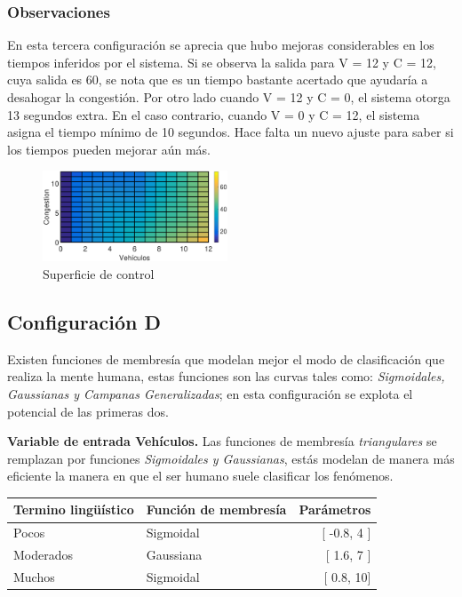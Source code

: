 \subsubsection{Observaciones}
\begin{multicols}{2}

	En esta tercera configuración se aprecia que hubo mejoras considerables en los tiempos inferidos por el sistema. Si se observa la salida para V = 12 y C = 12, cuya salida es 60, se nota que es un tiempo bastante acertado que ayudaría a desahogar la congestión. Por otro lado cuando V = 12 y C = 0, el sistema otorga 13 segundos extra. En el caso contrario, cuando V = 0 y C = 12, el sistema asigna el tiempo mínimo de 10 segundos. Hace falta un nuevo ajuste para saber si los tiempos pueden mejorar aún más.
	
	\begin{figure}[H]
		\includegraphics[width=0.49\textwidth]{Surfaces/Surface2D_C.eps}
		\caption{Superficie de control}
	\end{figure}
\end{multicols}
\pagebreak





\subsection{Configuración D}\label{section:configd}
Existen funciones de membresía que modelan mejor el modo de clasificación que realiza la mente humana, estas funciones son las curvas tales como: \textit{Sigmoidales, Gaussianas y Campanas Generalizadas}; en esta configuración se explota el potencial de las primeras dos.

\textbf{Variable de entrada Vehículos.} Las funciones de membresía \textit{triangulares} se remplazan por funciones \textit{Sigmoidales y Gaussianas}, estás modelan de manera más eficiente la manera en que el ser humano suele clasificar los fenómenos.
\begin{center}
	\begin{tabular}{llr} \toprule
		Termino lingüístico & Función de membresía & Parámetros \\ \midrule
		Pocos & Sigmoidal & [ -0.8, 4 ] \\
		Moderados & Gaussiana & [ 1.6, 7 ] \\
		Muchos & Sigmoidal & [ 0.8, 10] \\ \bottomrule
	\end{tabular}
\end{center}

